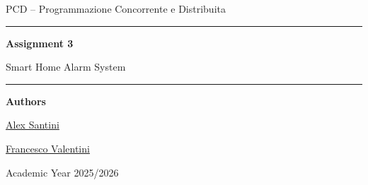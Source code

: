 \begin{titlepage}
    \centering
    \vspace*{2.2cm}

    {\Large PCD -- Programmazione Concorrente e Distribuita\par}
    \vspace{1.2cm}
    {\rule{0.82\textwidth}{0.5pt}\par}
    \vspace{0.9cm}
    {\huge\bfseries Assignment 3\par}
    \vspace{0.35cm}
    {\LARGE Smart Home Alarm System\par}
    \vspace{0.45cm}
    \vspace{0.9cm}
    {\rule{0.82\textwidth}{0.5pt}\par}

    \vspace{1.6cm}
    {\large\textbf{Authors}\par}
    \vspace{0.25cm}
    {\large \href{https://github.com/AlexSantini10}{Alex Santini}\par}
    {\large \href{https://github.com/Val0rous}{Francesco Valentini}\par}

    \vfill
    {\large Academic Year 2025/2026\par}
    {\large \todayFullUK\par}
\end{titlepage}
